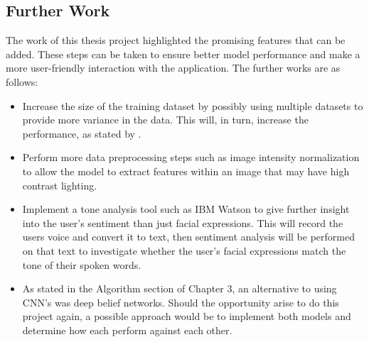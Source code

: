 \subsection{Further Work}
The work of this thesis project highlighted the promising features that can be added. These steps can be taken to ensure better model performance and make a more user-friendly interaction with the application. The further works are as follows:
\begin{itemize}
	\item Increase the size of the training dataset by possibly using multiple datasets to provide more variance in the data. This will, in turn, increase the performance, as stated by \citeauthor{LOPES}.
	\item Perform more data preprocessing steps such as image intensity normalization to allow the model to extract features within an image that may have high contrast lighting.
	\item Implement a tone analysis tool such as IBM Watson to give further insight into the user's sentiment than just facial expressions. This will record the users voice and convert it to text, then sentiment analysis will be performed on that text to investigate whether the user's facial expressions match the tone of their spoken words.
	\item As stated in the Algorithm section of Chapter 3, an alternative to using CNN's was deep belief networks. Should the opportunity arise to do this project again, a possible approach would be to implement both models and determine how each perform against each other.
\end{itemize}
